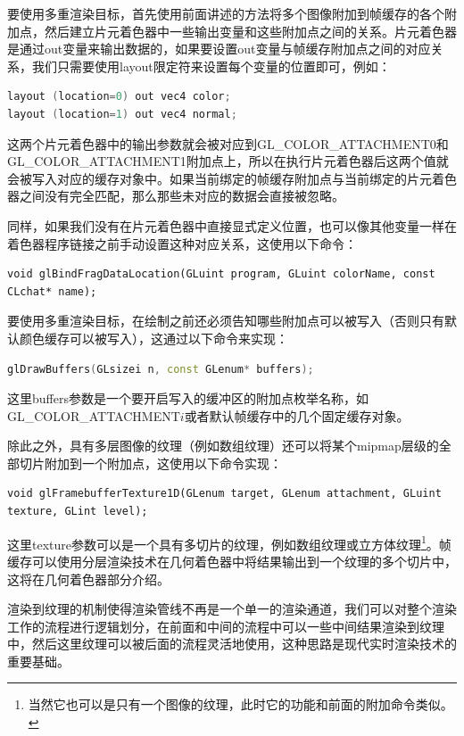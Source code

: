 要使用多重渲染目标，首先使用前面讲述的方法将多个图像附加到帧缓存的各个附加点，然后建立片元着色器中一些输出变量和这些附加点之间的关系。片元着色器是通过out变量来输出数据的，如果要设置out变量与帧缓存附加点之间的对应关系，我们只需要使用layout限定符来设置每个变量的位置即可，例如：

\begin{lstlisting}[language=C++]
layout (location=0) out vec4 color;
layout (location=1) out vec4 normal;
\end{lstlisting}

这两个片元着色器中的输出参数就会被对应到GL\_COLOR\_ATTACHMENT0和GL\_COLOR\_ATTACHMENT1附加点上，所以在执行片元着色器后这两个值就会被写入对应的缓存对象中。如果当前绑定的帧缓存附加点与当前绑定的片元着色器之间没有完全匹配，那么那些未对应的数据会直接被忽略。

同样，如果我们没有在片元着色器中直接显式定义位置，也可以像其他变量一样在着色器程序链接之前手动设置这种对应关系，这使用以下命令：

\begin{lstlisting}
void glBindFragDataLocation(GLuint program, GLuint colorName, const CLchat* name);
\end{lstlisting}

要使用多重渲染目标，在绘制之前还必须告知哪些附加点可以被写入（否则只有默认颜色缓存可以被写入），这通过以下命令来实现：

\begin{lstlisting}[language=C++]
glDrawBuffers(GLsizei n, const GLenum* buffers);
\end{lstlisting}

这里buffers参数是一个要开启写入的缓冲区的附加点枚举名称，如GL\_COLOR\_ATTACHMENT$i$或者默认帧缓存中的几个固定缓存对象。

除此之外，具有多层图像的纹理（例如数组纹理）还可以将某个mipmap层级的全部切片附加到一个附加点，这使用以下命令实现：

\begin{lstlisting}
void glFramebufferTexture1D​(GLenum target​, GLenum attachment​, GLuint texture​, GLint level​);
\end{lstlisting}

这里texture参数可以是一个具有多切片的纹理，例如数组纹理或立方体纹理\footnote{当然它也可以是只有一个图像的纹理，此时它的功能和前面的附加命令类似。}。帧缓存可以使用分层渲染技术在几何着色器中将结果输出到一个纹理的多个切片中，这将在几何着色器部分介绍。

渲染到纹理的机制使得渲染管线不再是一个单一的渲染通道，我们可以对整个渲染工作的流程进行逻辑划分，在前面和中间的流程中可以一些中间结果渲染到纹理中，然后这里纹理可以被后面的流程灵活地使用，这种思路是现代实时渲染技术的重要基础。

